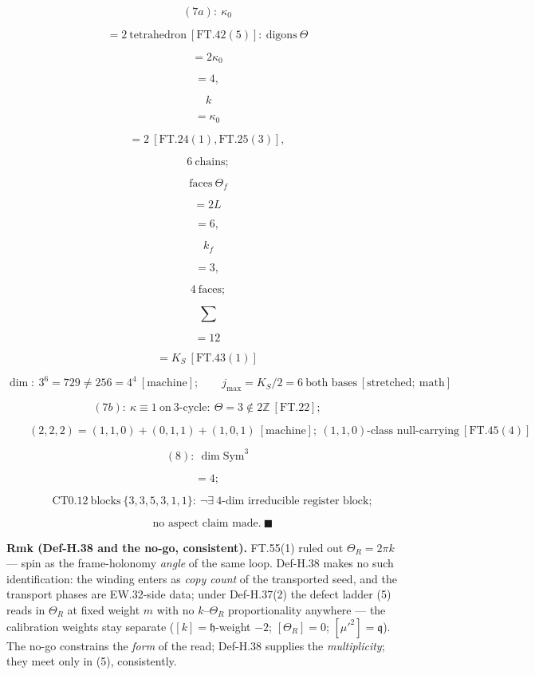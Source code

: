 \begin{theorem}
\[
(7a):\ \kappa_0
\]

\[
= 2\ \text{tetrahedron}\ [\mathrm{FT.42}(5)]:\ \text{digons}\ \Theta
\]

\[
= 2\kappa_0
\]

\[
= 4,
\]

\[
\ k
\]

\[
= \kappa_0
\]

\[
= 2\ [\mathrm{FT.24}(1),\mathrm{FT.25}(3)],
\]

\[
\ 6\ \text{chains};
\]

\[
\ \text{faces}\ \Theta_f
\]

\[
= 2L
\]

\[
= 6,
\]

\[
\ k_f
\]

\[
= 3,
\]

\[
\ 4\ \text{faces};
\]

\[
\ \sum
\]

\[
= 12
\]

\[
= K_S\ [\mathrm{FT.43}(1)]
\]

\[
\dim:\ 3^6=729\ne256=4^4\ [\text{machine}];\qquad j_{\max}=K_S/2=6\ \text{both bases}\ [\text{stretched};\ \text{math}]
\]

\[
(7b):\ \kappa\equiv1\ \text{on}\ 3\text{-cycle}:\ \Theta=3\notin2\mathbb Z\ [\mathrm{FT.22}];
\]

\[
\qquad (2,2,2)=(1,1,0)+(0,1,1)+(1,0,1)\ [\text{machine}];\ (1,1,0)\text{-class null-carrying}\ [\mathrm{FT.45}(4)]
\]

\[
(8):\ \dim\mathrm{Sym}^3
\]

\[
= 4;
\]

\[
\quad\mathrm{CT0.12}\ \text{blocks}\ \{3,3,5,3,1,1\}:\ \neg\exists\ 4\text{-dim irreducible register block};
\]

\[
\quad\text{no aspect claim made}.\ \blacksquare
\]

\textbf{Rmk (Def-H.38 and the no-go, consistent).} FT.55(1) ruled out $\Theta_R=2\pi k$ — spin as the frame-holonomy \textit{angle} of the same loop. Def-H.38 makes no such identification: the winding enters as \textit{copy count} of the transported seed, and the transport phases are EW.32-side data; under Def-H.37(2) the defect ladder (5) reads in $\Theta_R$ at fixed weight $m$ with no $k$–$\Theta_R$ proportionality anywhere — the calibration weights stay separate ($[k]=\mathfrak h$-weight $-2$; $[\Theta_R]=0$; $[\hat\mu'^2]=\mathfrak q$). The no-go constrains the \textit{form} of the read; Def-H.38 supplies the \textit{multiplicity}; they meet only in (5), consistently.


\end{theorem}
